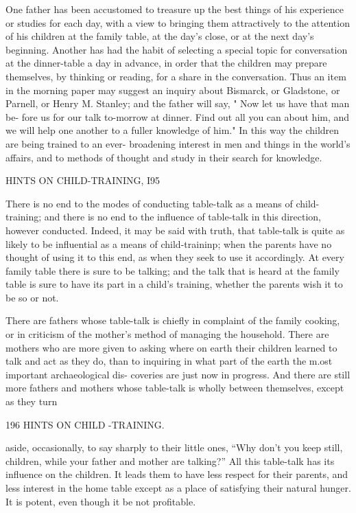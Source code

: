 \documentclass[
]{book}
\begin{document}
One father has been accustomed to treasure up the best things of his experience or studies for each day, with a view to bringing them attractively to the attention of his children at the family table, at the day's close, or at the next day's beginning. Another has had the habit of selecting a special topic for conversation at the dinner-table a day in advance, in order that the children may prepare themselves, by thinking or reading, for a share in the conversation. Thus an item in the morning paper may suggest an inquiry about Bismarck, or Gladstone, or Parnell, or Henry M. Stanley; and the father will say, " Now let us have that man be- fore us for our talk to-morrow at dinner. Find out all you can about him, and we will help one another to a fuller knowledge of him." In this way the children are being trained to an ever- broadening interest in men and things in the world's affairs, and to methods of thought and study in their search for knowledge.

HINTS ON CHILD-TRAINING, I95

There is no end to the modes of conducting table-talk as a means of child-training; and there is no end to the influence of table-talk in this direction, however conducted. Indeed, it may be said with truth, that table-talk is quite as likely to be influential as a means of child-traininp; when the parents have no thought of using it to this end, as when they seek to use it accordingly. At every family table there is sure to be talking; and the talk that is heard at the family table is sure to have its part in a child's training, whether the parents wish it to be so or not.

There are fathers whose table-talk is chiefly in complaint of the family cooking, or in criticism of the mother's method of managing the household. There are mothers who are more given to asking where on earth their children learned to talk and act as they do, than to inquiring in what part of the earth the m.ost important archaeological dis- coveries are just now in progress. And there are still more fathers and mothers whose table-talk is wholly between themselves, except as they turn

196 HINTS ON CHILD -TRAINING.

aside, occasionally, to say sharply to their little ones, ``Why don't you keep still, children, while your father and mother are talking?'' All this table-talk has its influence on the children. It leads them to have less respect for their parents, and less interest in the home table except as a place of satisfying their natural hunger. It is potent, even though it be not profitable.
\end{document}
